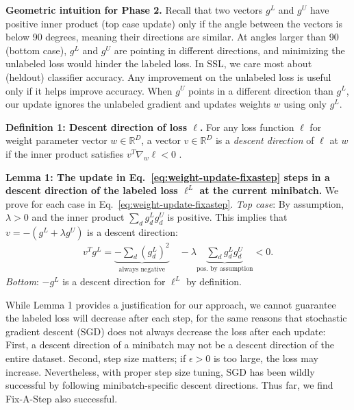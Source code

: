 \textbf{Geometric intuition for Phase 2.} Recall that two vectors $g^L$ and $g^U$ have positive inner product (top case update) only if the angle between the vectors is below 90 degrees, meaning their directions are similar.
At angles larger than 90 (bottom case), $g^L$ and $g^U$ are pointing in different directions, and minimizing the unlabeled loss would hinder the labeled loss.
In SSL, we care most about (heldout) classifier accuracy.
Any improvement on the unlabeled loss is useful only if it helps improve accuracy.
When $g^U$ points in a different direction than $g^L$, our update ignores the unlabeled gradient and updates weights $w$ using only $g^L$.

\textbf{Definition 1: Descent direction of loss $\ell$.}
For any loss function $\ell$ for weight parameter vector $w \in \mathbb{R}^D$, a vector $v \in \mathbb{R}^D$ is a \emph{descent direction} of $\ell$ at $w$ if the inner product satisfies $v^T \nabla_w \ell < 0$ \citep{boydSecDescentMethods2004}.

\textbf{Lemma 1: The update in Eq.~\eqref{eq:weight-update-fixastep} steps in a descent direction of the labeled loss $\ell^L$ at the current minibatch.}
We prove for each case in Eq.~\eqref{eq:weight-update-fixastep}.
\emph{Top case}: By assumption, $\lambda > 0$ and the inner product $\sum_d g^L_d g^U_d$ is positive. This implies that $v{=}-(g^L + \lambda g^U)$ is a descent direction:
\begin{align}
v^T g^L =
	\underbrace{- \textstyle \sum_d (g^L_d)^2}_{\text{always negative}}
	\quad - \lambda \underbrace{\textstyle \sum_d g^L_d g^U_d}_{\text{pos. by assumption}}
< 0.
\end{align}
\emph{Bottom}: $-g^L$ is a descent direction for $\ell^L$ by definition.

While Lemma 1 provides a justification for our approach, we cannot guarantee the labeled loss will decrease after each step, for the same reasons that stochastic gradient descent (SGD) does not always decrease the loss after each update:
First, a descent direction of a minibatch may not be a descent direction of the entire dataset.
Second, step size matters; if $\epsilon > 0$  is too large, the loss may increase.
Nevertheless, with proper step size tuning, SGD has been wildly successful by following minibatch-specific descent directions.
Thus far, we find Fix-A-Step also successful.

